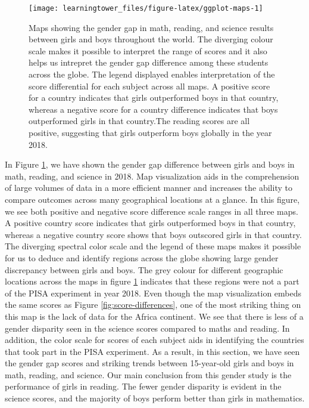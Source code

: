 \begin{figure}[H]
\texttt{[image: learningtower\_files/figure-latex/ggplot-maps-1]} \caption{Maps showing the gender gap in math, reading, and science results between girls and boys throughout the world. The diverging colour scale makes it possible to interpret the range of scores and it also helps us intrepret the gender gap difference among these students across the globe. The legend displayed enables interpretation of the score differential for each subject across all maps. A positive score for a country indicates that girls outperformed boys in that country, whereas a negative score for a country difference indicates that boys outperformed girls in that country.The reading scores are all positive, suggesting that girls outperform boys globally in the year 2018.}\label{fig:ggplot-maps}
\end{figure}

In Figure \ref{fig:ggplot-maps}, we have shown the gender gap difference between girls and boys in math, reading, and science in 2018. Map visualization aids in the comprehension of large volumes of data in a more efficient manner and increases the ability to compare outcomes across many geographical locations at a glance. In this figure, we see both positive and negative score difference scale ranges in all three maps. A positive country score indicates that girls outperformed boys in that country, whereas a negative country score shows that boys outscored girls in that country. The diverging spectral color scale and the legend of these maps makes it possible for us to deduce and identify regions across the globe showing large gender discrepancy between girls and boys. The grey colour for different geographic locations across the maps in figure \ref{fig:ggplot-maps} indicates that these regions were not a part of the PISA experiment in year 2018. Even though the map visualization embeds the same scores as Figure \ref{fig:score-differences}, one of the most striking thing on this map is the lack of data for the Africa continent. We see that there is less of a gender disparity seen in the science scores compared to maths and reading. In addition, the color scale for scores of each subject aids in identifying the countries that took part in the PISA experiment. As a result, in this section, we have seen the gender gap scores and striking trends between 15-year-old girls and boys in math, reading, and science. Our main conclusion from this gender study is the performance of girls in reading. The fewer gender disparity is evident in the science scores, and the majority of boys perform better than girls in mathematics.

